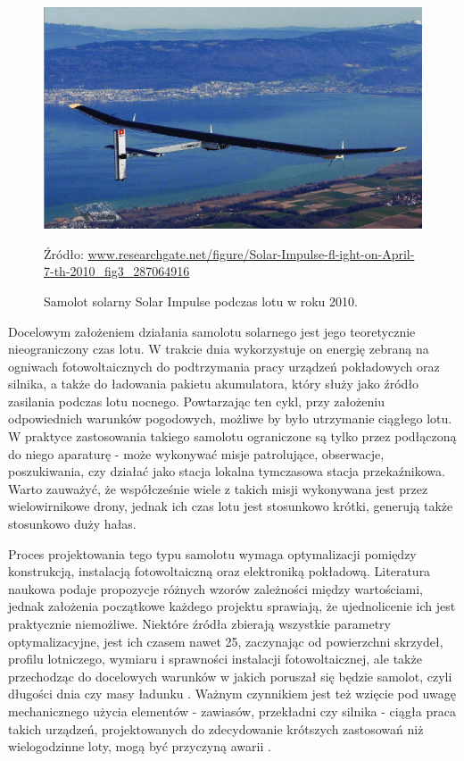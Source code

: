 \documentclass[12pt, a4paper]{article}
\begin{document}
\begin{figure}[ht]
    \centering
    \includegraphics[width=1\textwidth]{solarimpulse}
    \caption{Samolot solarny Solar Impulse podczas lotu w roku 2010.}
    \small Źródło: \url{www.researchgate.net/figure/Solar-Impulse-fl-ight-on-April-7-th-2010_fig3_287064916}
    \label{fig:solimp}
\end{figure}

Docelowym założeniem działania samolotu solarnego jest jego teoretycznie nieograniczony czas lotu. W trakcie dnia wykorzystuje on energię zebraną na ogniwach fotowoltaicznych do podtrzymania pracy urządzeń pokładowych oraz silnika, a także do ładowania pakietu akumulatora, który służy jako źródło zasilania podczas lotu nocnego. Powtarzając ten cykl, przy założeniu odpowiednich warunków pogodowych, możliwe by było utrzymanie ciągłego lotu. W praktyce zastosowania takiego samolotu ograniczone są tylko przez podłączoną do niego aparaturę - może wykonywać misje patrolujące, obserwacje, poszukiwania, czy działać jako stacja lokalna tymczasowa stacja przekaźnikowa. Warto zauważyć, że współcześnie wiele z takich misji wykonywana jest przez wielowirnikowe drony, jednak ich czas lotu jest stosunkowo krótki, generują także stosunkowo duży hałas.

Proces projektowania tego typu samolotu wymaga optymalizacji pomiędzy konstrukcją, instalacją fotowoltaiczną oraz elektroniką pokładową. Literatura naukowa podaje propozycje różnych wzorów zależności między wartościami, jednak założenia początkowe każdego projektu sprawiają, że ujednolicenie ich jest praktycznie niemożliwe. Niektóre źródła zbierają wszystkie parametry optymalizacyjne, jest ich czasem nawet 25, zaczynając od powierzchni skrzydeł, profilu lotniczego, wymiaru i sprawności instalacji fotowoltaicznej, ale także przechodząc do docelowych warunków w jakich poruszał się będzie samolot, czyli długości dnia czy masy ładunku \cite{robotics}. Ważnym czynnikiem jest też wzięcie pod uwagę mechanicznego użycia elementów - zawiasów, przekładni czy silnika - ciągła praca takich urządzeń, projektowanych do zdecydowanie krótszych zastosowań niż wielogodzinne loty, mogą być przyczyną awarii \cite{developing a solar}. 
\end{document}
